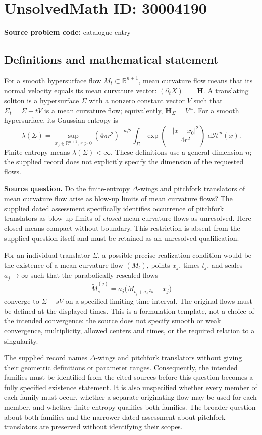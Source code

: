 \documentclass[11pt]{article}
\newcommand{\R}{\mathbb{R}}
\newcommand{\dd}{\,\mathrm{d}}
\begin{document}
\section*{UnsolvedMath ID: 30004190}
\textbf{Source problem code:} catalogue entry
\subsection{Definitions and mathematical statement}
For a smooth hypersurface flow \(M_t\subset\R^{n+1}\), mean curvature flow means that its normal velocity equals its mean curvature vector: \((\partial_t X)^\perp=\mathbf H\). A translating soliton is a hypersurface \(\Sigma\) with a nonzero constant vector \(V\) such that \(\Sigma_t=\Sigma+tV\) is a mean curvature flow; equivalently, \(\mathbf H_\Sigma=V^\perp\). For a smooth hypersurface, its Gaussian entropy is
\[
\lambda(\Sigma)=\sup_{x_0\in\R^{n+1},\,r>0}(4\pi r^2)^{-n/2}\int_\Sigma\exp\!\left(-\frac{|x-x_0|^2}{4r^2}\right)\,\dd\mathcal H^n(x).
\]
Finite entropy means \(\lambda(\Sigma)<\infty\). These definitions use a general dimension \(n\); the supplied record does not explicitly specify the dimension of the requested flows.

\textbf{Source question.} Do the finite-entropy \(\Delta\)-wings and pitchfork translators of mean curvature flow arise as blow-up limits of mean curvature flows? The supplied dated assessment specifically identifies occurrence of pitchfork translators as blow-up limits of \emph{closed} mean curvature flows as unresolved. Here closed means compact without boundary. This restriction is absent from the supplied question itself and must be retained as an unresolved qualification.

For an individual translator \(\Sigma\), a possible precise realization condition would be the existence of a mean curvature flow \((M_t)\), points \(x_j\), times \(t_j\), and scales \(a_j\to\infty\) such that the parabolically rescaled flows
\[
\widetilde M^{(j)}_s=a_j\bigl(M_{t_j+a_j^{-2}s}-x_j\bigr)
\]
converge to \(\Sigma+sV\) on a specified limiting time interval. The original flows must be defined at the displayed times. This is a formulation template, not a choice of the intended convergence: the source does not specify smooth or weak convergence, multiplicity, allowed centers and times, or the required relation to a singularity.

The supplied record names \(\Delta\)-wings and pitchfork translators without giving their geometric definitions or parameter ranges. Consequently, the intended families must be identified from the cited sources before this question becomes a fully specified existence statement. It is also unspecified whether every member of each family must occur, whether a separate originating flow may be used for each member, and whether finite entropy qualifies both families. The broader question about both families and the narrower dated assessment about pitchfork translators are preserved without identifying their scopes.
\end{document}
